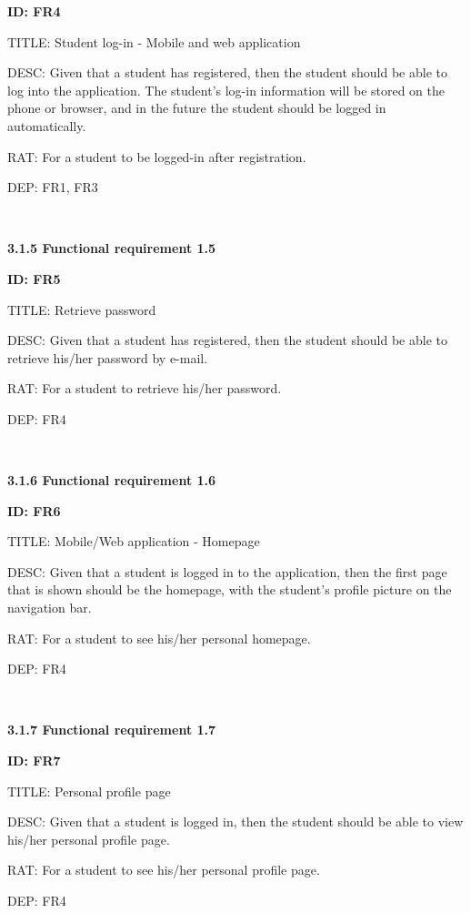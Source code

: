 \documentclass[12pt,a4paper]{article}
\begin{document}
\begin{flushleft}
        \textbf{ID: FR4}

        TITLE: Student log-in - Mobile and web application

        DESC: Given that a student has registered, then the student should be
        able to log into the application. The student's log-in information will
        be stored on the phone or browser, and in the future the student should
        be logged in automatically.

        RAT: For a student to be logged-in after registration.

        DEP: FR1, FR3


        \

        \textbf{3.1.5 Functional requirement 1.5}

        \textbf{ID: FR5}

        TITLE: Retrieve password

        DESC: Given that a student has registered, then the student should be
        able to retrieve his/her password by e-mail.

        RAT: For a student to retrieve his/her password.

        DEP: FR4

        \

        \textbf{3.1.6 Functional requirement 1.6}

        \textbf{ID: FR6}

        TITLE: Mobile/Web application - Homepage

        DESC: Given that a student is logged in to the application, then the
        first page that is shown should be the homepage, with the student's
        profile picture on the navigation bar.

        RAT: For a student to see his/her personal homepage.

        DEP: FR4

        \

        \textbf{3.1.7 Functional requirement 1.7}

        \textbf{ID: FR7}

        TITLE: Personal profile page

        DESC: Given that a student is logged in, then the student should be able
        to view his/her personal profile page.

        RAT: For a student to see his/her personal profile page.

        DEP: FR4


        \
\newpage



\end{flushleft}
\end{document}
